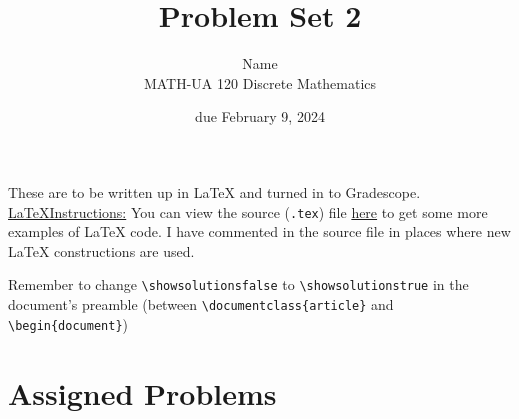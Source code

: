 \documentclass{article}
\title{Problem Set 2}
\author{%
    Name
\\  MATH-UA 120 Discrete Mathematics
}
\date{due February 9, 2024}
\newif\ifshowsolutions
\newcommand{\danger}{\marginpar[\hfill\dbend]{\dbend\hfill}}
\theoremstyle{definition}
\begin{document}
\maketitle



These are to be written up in \LaTeX{} and turned in to Gradescope.\\



\ifshowsolutions
    \SetupExSheets{solution/print=true}
\else
    \danger
 \underline{ \LaTeX  Instructions:}  You can view the source (\texttt{.tex}) file \href{https://bit.ly/48Wbgod}{here} to get some more examples of \LaTeX{} code.  I have commented in the source file in places where new \LaTeX{} constructions are used.
  
  Remember to change \verb|\showsolutionsfalse| to \verb|\showsolutionstrue|
    in the document's preamble 
    (between \verb|\documentclass{article}| and \verb|\begin{document}|)
\fi

\section*{Assigned Problems}
\end{document}
